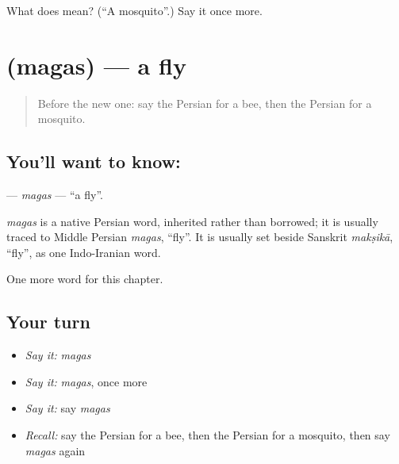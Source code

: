 \begin{tcolorbox}[breakable,colback=teal!4,colframe=teal!35!black,title={Before you move on}]
What does  mean? (\textquotedblleft{}A mosquito\textquotedblright{}.) Say it once more.
\end{tcolorbox}
\section[\texorpdfstring{\fa{مگس} (magas)}{مگس (magas)}]{ (magas) — a fly}

\label{lesson:FA-C107-magas}



\begin{quote}
Before the new one: say the Persian for a bee, then the Persian for a mosquito.
\end{quote}

\subsection*{You'll want to know: }
\textbf{} — \emph{magas} — \textquotedblleft{}a fly\textquotedblright{}.

\begin{cousinweb}
\emph{magas} is a native Persian word, inherited rather than borrowed; it is usually traced to Middle Persian \emph{magas}, \textquotedblleft{}fly\textquotedblright{}. It is usually set beside Sanskrit \emph{makṣikā}, \textquotedblleft{}fly\textquotedblright{}, as one Indo-Iranian word.
\end{cousinweb}

\begin{grammarlens}[title={What you've built}]
One more word for this chapter.
\end{grammarlens}

\subsection*{Your turn}
\begin{itemize}
\raggedright
  \item \emph{Say it:} \emph{magas}
  \item \emph{Say it:} \emph{magas}, once more
  \item \emph{Say it:} say \emph{magas}
  \item \emph{Recall:} say the Persian for a bee, then the Persian for a mosquito, then say \emph{magas} again
\end{itemize}

